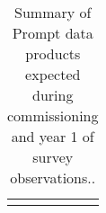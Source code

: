 \begin{table}
{\begin{tabular}{|p{0.31\linewidth} | p{0.32\linewidth}  | p{0.32\linewidth}|}
\arrayrulecolor{black}\hline
\end{tabular}}
\caption{Summary of Prompt data products expected during commissioning and year 1 of survey observations..}
\label{tab:prompt-data-products}
\end{table}
